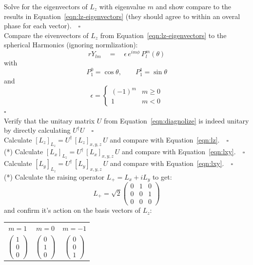 \documentclass[12pt]{article}
\begin{document}
\exercise Solve for the eigenvectors of $L_z$ with eigenvalue $m$ and
show compare to the results in Equation~\ref{eqn:lz-eigenvectors} (they should agree to within an overal phase for each vector).$\quad \square$\\[5pt]

\exercise Compare the eivenvectors of $L_z$ from Equation~\ref{eqn:lz-eigenvectors} to the
spherical Harmonics (ignoring normlization):
$$r Y_{lm} \quad = \quad \epsilon \, e^{im\phi} \, P_l^m(\theta)$$
with
$$P_1^0 = \cos \theta, \quad \quad P_1^1 = \sin \theta$$
and
\begin{equation*}
\epsilon = \begin{cases} (-1)^m & m \geq 0 \\ 1 & m < 0 \end{cases}
\end{equation*}
$\square$\\[5pt]


\exercise Verify that the unitary matrix $U$ from Equation~\ref{eqn:diagnolize} is indeed unitary by directly calculating $U^\dagger U$$\quad \square$\\[5pt]

\exercise Calculate $[L_z]_{L_z} =  U^\dagger \, [L_z]_{x,y,z} \, U $ and compare with Equation~\ref{eqn:lz}.$\quad \square$\\[5pt]

\exercise (*) Calculate $[L_x]_{L_z} =  U^\dagger \, [L_x]_{x,y,z} \, U $ and compare with Equation~\ref{eqn:lxy}.$\quad \square$\\[5pt]

\exercise Calculate $[L_y]_{L_z} =  U^\dagger \, [L_y]_{x,y,z} \, U $ and compare with Equation~\ref{eqn:lxy}.$\quad \square$\\[5pt]

\exercise (*) Calculate the raising operator $L_+ = L_x + i L_y$ to get:
$$
L_+ = \sqrt{2}\begin{pmatrix} 0 & 1 & 0 \\ 0 & 0 & 1 \\ 0 & 0 & 0 \end{pmatrix}
$$
and confirm it's action on the basis vectors of $L_z$:
\begin{center}
\begin{tabular}{ccc}
  $m=1$ & $m=0$ &  $m=-1$ \\
$\begin{pmatrix} 1 \\ 0 \\ 0 \end{pmatrix}$ &
$\begin{pmatrix}  0 \\  1 \\ 0 \end{pmatrix}$ &
$\begin{pmatrix}  0 \\ 0 \\ 1 \end{pmatrix}$ \\
\end{tabular}
\end{center}
\end{document}
